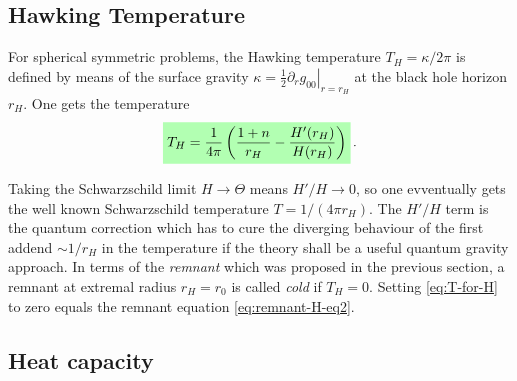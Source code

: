 \documentclass[12pt,a4paper]{report}
\numberwithin{equation}{chapter}
\newcommand{\highlight}[1]{%
  \colorbox{green!30}{$\displaystyle#1$}}
\begin{document}
\subsection{Hawking Temperature}\label{sec:T-for-H}

For spherical symmetric problems, the Hawking temperature $T_H=\kappa/2\pi$ is defined by means of the surface gravity $\kappa = \frac 12 \left. \partial_r g_{00} \right|_{r=r_H}$ at the black hole horizon $r_H$. One gets the temperature
\begin{equation}\label{eq:T-for-H}
\highlight{
T_H = \frac{1}{4\pi}
\left(
\frac{1+n}{r_H}
- \frac{H'(r_H)}{H(r_H)}
\right)
}\,.
\end{equation}
%
%

Taking the Schwarzschild limit $H\to\Theta$ means $H'/H\to 0$, so one evventually gets the well known Schwarzschild temperature $T=1/(4\pi r_H)$. The $H'/H$ term is the quantum correction which has to cure the diverging behaviour of the first addend $\sim 1/r_H$ in the temperature if the theory shall be a useful quantum gravity approach. In terms of the \emph{remnant} which was proposed in the previous section, a remnant at extremal radius $r_H=r_0$ is called \emph{cold} if $T_H=0$. Setting \eqref{eq:T-for-H} to zero equals the remnant equation \eqref{eq:remnant-H-eq2}.


\subsection{Heat capacity}
\end{document}
